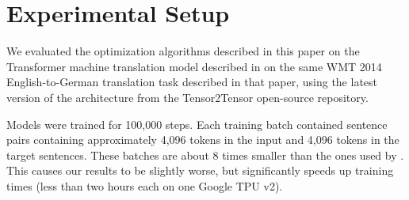 \documentclass{article}
\begin{document}




\section{Experimental Setup}
\label{sec:experiments}

We evaluated the optimization algorithms described in this paper on the Transformer machine translation model described in \citet{Vaswani17Attention} on the same WMT 2014 English-to-German translation task described in that paper, using the latest version of the architecture from the Tensor2Tensor open-source repository. 

Models were trained for 100,000 steps.  Each training batch contained sentence pairs containing approximately 4,096 tokens in the input and 4,096 tokens in the target sentences.  These batches are about 8 times smaller than the ones used by \citet{Vaswani17Attention}.  This causes our results to be slightly worse, but significantly speeds up training times (less than two hours each on one Google TPU v2). 
\end{document}
